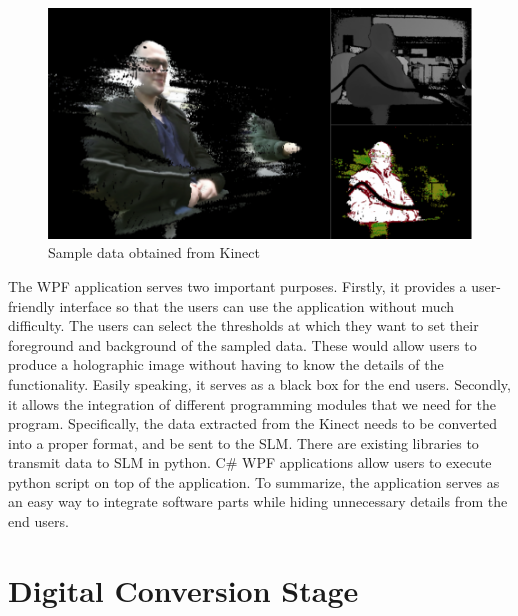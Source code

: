 \documentclass[12pt]{article}
\begin{document}
\begin{figure}
    \centering
    \includegraphics[width=\textwidth]{kinectsample}
    \caption{Sample data obtained from Kinect}
    \label{fig:my_label}
\end{figure}

The WPF application serves two important purposes. Firstly, it provides a user-friendly interface so that the users can use the application without much difficulty. The users can select the thresholds at which they want to set their foreground and background of the sampled data. These would allow users to produce a holographic image without having to know the details of the functionality. Easily speaking, it serves as a black box for the end users. Secondly, it allows the integration of different programming modules that we need for the program. Specifically, the data extracted from the Kinect needs to be converted into a proper format, and be sent to the SLM. There are existing libraries to transmit data to SLM in python. C\# WPF applications allow users to execute python script on top of the application. To summarize, the application serves as an easy way to integrate software parts while hiding unnecessary details from the end users. 
\newpage
\section{Digital Conversion Stage}
\end{document}
